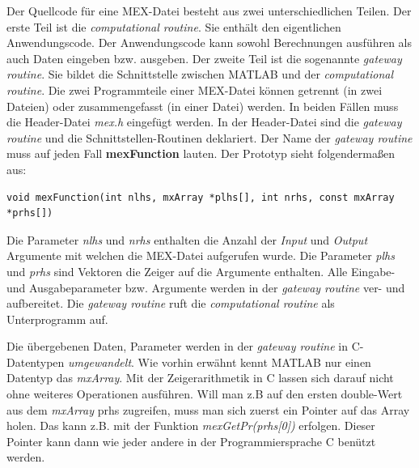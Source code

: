 \documentclass[a4paper,11pt]{article}
\begin{document}
Der Quellcode für eine MEX-Datei besteht aus zwei unterschiedlichen
Teilen. Der erste Teil ist die \textit{computational routine}. Sie
enthält den eigentlichen Anwendungscode. Der Anwendungscode kann
sowohl Berechnungen ausführen als auch Daten eingeben bzw. ausgeben.
Der zweite Teil ist die sogenannte \textit{gateway routine}. Sie
bildet die Schnittstelle zwischen MATLAB und der
\textit{computational routine}.
Die zwei Programmteile einer MEX-Datei können getrennt (in zwei Dateien)
oder zusammengefasst (in einer Datei) werden. In beiden Fällen muss
die Header-Datei \textit{mex.h} eingefügt werden. In der Header-Datei
sind die \textit{gateway routine} und die Schnittstellen-Routinen
deklariert. Der Name der \textit{gateway routine} muss auf jeden Fall
\textbf{mexFunction} lauten. Der Prototyp sieht folgendermaßen aus:
\begin{verbatim}
void mexFunction(int nlhs, mxArray *plhs[], int nrhs, const mxArray *prhs[])
\end{verbatim}
Die Parameter \textit{nlhs} und \textit{nrhs} enthalten die Anzahl
der \textit{Input} und \textit{Output} Argumente mit welchen die MEX-Datei
aufgerufen wurde. Die Parameter \textit{plhs} und \textit{prhs} sind
Vektoren die Zeiger auf die Argumente enthalten.
Alle Eingabe- und Ausgabeparameter bzw. Argumente werden in der
\textit{gateway routine} ver- und aufbereitet. Die \textit{gateway routine}
ruft die \textit{computational routine} als Unterprogramm auf.

Die übergebenen Daten, Parameter werden in der
\textit{gateway routine} in C-Datentypen \textit{umgewandelt}.
Wie vorhin erwähnt kennt MATLAB nur einen Datentyp das
\textit{mxArray}. Mit der Zeigerarithmetik in C lassen
sich darauf nicht ohne weiteres Operationen ausführen.
Will man z.B auf den ersten double-Wert aus dem
\textit{mxArray} prhs zugreifen, muss man sich zuerst
ein Pointer auf das Array holen. Das kann z.B. mit
der Funktion \textit{mexGetPr(prhs[0])} erfolgen.
Dieser Pointer kann dann wie jeder andere in der
Programmiersprache C benützt werden.
\end{document}
